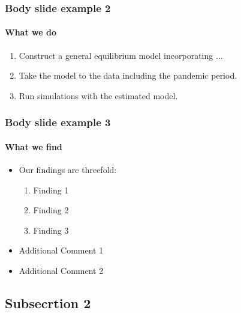 \documentclass[
	11pt, %
]{beamer}
\begin{document}
\begin{frame}
	\frametitle{Body slide example 2} %
	\framesubtitle{What we do}  %
	\begin{enumerate}
		\item Construct a general equilibrium model incorporating ... 
		\item Take the model to the data including the pandemic period.
		\item Run simulations with the estimated model.
	\end{enumerate}
\end{frame}

\begin{frame}
	\frametitle{Body slide example 3} %
	\framesubtitle{What we find}  %
	
	\begin{itemize}
		\item Our findings are threefold:
		\begin{enumerate}
			\item Finding 1
			\item Finding 2
			\item Finding 3
		\end{enumerate}
	\end{itemize}
	
	\bigskip %
	
	\begin{itemize}
		\item Additional Comment 1
		\item Additional Comment 2
	\end{itemize}
\end{frame}

\subsection{Subsecrtion 2} %
\end{document}
